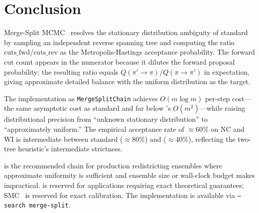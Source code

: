 \section{Conclusion}
\label{sec:conclusion}

Merge-Split MCMC~\citep{janson2022} resolves the stationary distribution
ambiguity of standard \recom{}~\citep{deford2021} by sampling an independent
reverse spanning tree and computing the ratio
$\mathrm{cuts\_fwd} / \mathrm{cuts\_rev}$ as the Metropolis-Hastings
acceptance probability.
The forward cut count appears in the numerator because it dilutes the
forward proposal probability; the resulting ratio equals
$Q(\pi' \!\to\! \pi) / Q(\pi \!\to\! \pi')$ in expectation, giving
approximate detailed balance with the uniform distribution as the target.

The implementation as \texttt{MergeSplitChain} achieves $O(m \log m)$
per-step cost---the same asymptotic cost as standard \recom{} and far below
\forestrecom{}'s $O(m^2)$---while raising distributional precision from
``unknown stationary distribution'' to ``approximately uniform.''
The empirical acceptance rate of $\approx\!60\%$ on NC and WI is intermediate
between standard \recom{} ($\approx\!80\%$) and \forestrecom{} ($\approx\!40\%$),
reflecting the two-tree heuristic's intermediate strictness.

\mergesplit{} is the recommended chain for production redistricting
ensembles where approximate uniformity is sufficient and ensemble size
or wall-clock budget makes \forestrecom{} impractical.
\forestrecom{} is reserved for applications requiring exact theoretical
guarantees; SMC~\citep{dellaLibera2026smc} is reserved for exact
calibration.
The implementation is available via \texttt{--search merge-split}.
